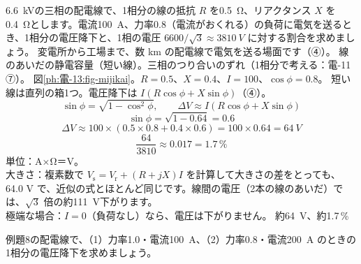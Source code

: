 \label{ph:電-13:ex8}
\begin{phreidai}[配電線の電圧降下]
\qty{6.6}{kV}の三相の配電線で、1相分の線の抵抗 $R$ を\qty{0.5}{\ohm}、リアクタンス $X$ を\qty{0.4}{\ohm}とします。電流\qty{100}{A}、力率0.8（電流がおくれる）の負荷に電気を送るとき、1相分の電圧降下と、1相の電圧 $6600/\sqrt3\approx\qty{3810}{V}$ に対する割合を求めましょう。
\phbamen
変電所から工場まで、数 km の配電線で電気を送る場面です（④）。
\phmushi
線のあいだの静電容量（短い線）。三相のつり合いのずれ（1相分で考える：電-11 ⑦）。
\phzu
図\ref{ph:電-13:fig-mijikai}。$R=0.5$、$X=0.4$、$I=100$、$\cos\phi=0.8$。
\phriyu
短い線は直列の箱1つ。電圧降下は $I(R\cos\phi+X\sin\phi)$（④）。
\phtateru
\[\sin\phi=\sqrt{1-\cos^2\phi},\qquad\Delta V\approx I(R\cos\phi+X\sin\phi)\]
\phtoku
\[\sin\phi=\sqrt{1-0.64}=0.6\]
\[\Delta V\approx100\times(0.5\times0.8+0.4\times0.6)=100\times0.64=\qty{64}{V}\]
\[\frac{64}{3810}\approx0.017=1.7\,\%\]
\phtashikame
単位：A×Ω＝V。\\
大きさ：複素数で $V_{\mathrm s}=V_{\mathrm r}+(R+jX)I$ を計算して大きさの差をとっても、64.0 V で、近似の式とほとんど同じです。線間の電圧（2本の線のあいだ）では、$\sqrt3$ 倍の約\qty{111}{V}下がります。\\
極端な場合：$I=0$（負荷なし）なら、電圧は下がりません。
\kotae 約\qty{64}{V}、約1.7\,\%
\end{phreidai}
\begin{jibun}
例題8の配電線で、（1）力率1.0・電流\qty{100}{A}、（2）力率0.8・電流\qty{200}{A} のときの1相分の電圧降下を求めましょう。
\end{jibun}

